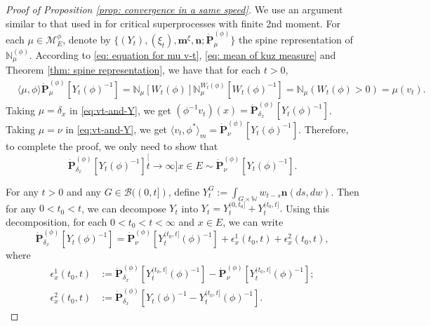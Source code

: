 \documentclass[12pt, a4paper]{amsart}
\theoremstyle{definition}
\numberwithin{equation}{section}
\begin{document}
\begin{proof}[Proof of Proposition \ref{prop: convergence in a same speed}]
	We use an argument similar to that used in \cite{RenSongSun2017Spine} for critical superprocesses with finite 2nd moment.
	For each $\mu\in\mathcal M^\phi_E$, denote by 
	$\{(Y_t), (\xi_t),\mathbf m^\xi, \mathbf n; \dot {\mathbf P}^{(\phi)}_\mu\}$
	the spine representation of $\mathbb N^{(\phi)}_\mu$. 
	According to \eqref	{eq: equation for mu v-t}, \eqref{eq: mean of kuz measure} and Theorem \ref{thm: spine representation}, 
	we have that for each $t>0$,
\[\begin{split}\label{eq:vt-and-Y}
	&\langle \mu,\phi \rangle \dot {\mathbf P}^{(\phi)}_\mu [Y_t(\phi)^{-1}]
	= \mathbb N_\mu[W_t(\phi)] \mathbb N^{W_t(\phi)}_\mu [W_t(\phi)^{-1}]
	= \mathbb N_\mu(W_t(\phi) > 0)
	= \mu(v_t).
\end{split}\]
	Taking $\mu = \delta_x$ in \eqref{eq:vt-and-Y}, we get $(\phi^{-1}v_t)(x) =\dot{\mathbf P}_{\delta_x}^{(\phi)}[Y_t(\phi)^{-1}]$.
	Taking $\mu = \nu$ in \eqref{eq:vt-and-Y}, we get $\langle v_t, \phi^*\rangle_m = \dot {\mathbf P}_{\nu}^{(\phi)} [Y_t(\phi)^{-1}]$.
	Therefore, to complete the proof, 
	we only need to show that
\[
	\dot{\mathbf P}_{\delta_x}^{(\phi)}[Y_t(\phi)^{-1}]
	\stackrel[t\to \infty]{x\in E}{\sim}  \dot {\mathbf P}_\nu^{(\phi)} [Y_t(\phi)^{-1}].
\]

	For any $t>0$ and any $G\in \mathscr B((0,t])$, define
$
	Y^G_t
	:= \int_{G\times \mathbb W} w_{t-s} \mathbf n(ds,dw).
$
	Then for any $0 < t_0 < t$, we can decompose $Y_t$ into
$
	Y_t
	= Y^{(0,t_0]}_t + Y^{(t_0,t]}_t.
$
	Using this decomposition, for each $0<t_0<t<\infty$ and $x\in E$, we can write
\[\label{eq: starting point of phi-1v_t(x)}
	 \dot{\mathbf P}_{\delta_x}^{(\phi)}[Y_t(\phi)^{-1}]
	= \dot {\mathbf P}_\nu^{(\phi)} [Y^{(t_0,t]}_t(\phi)^{-1}] + \epsilon_x^1(t_0,t) +\epsilon_x^2(t_0,t),
\]
	where
\[\begin{split}
	\epsilon_x^1(t_0,t)
	&:= \dot {\mathbf P}_{\delta_x}^{(\phi)} [Y^{(t_0,t]}_t(\phi)^{-1}] - \dot {\mathbf P}_\nu^{(\phi)} [Y^{(t_0,t]}_t(\phi)^{-1}];
	\\\epsilon_x^2(t_0,t)
	&:= \dot{\mathbf P}_{\delta_x}^{(\phi)}[Y_t(\phi)^{-1} - Y^{(t_0,t]}_t(\phi)^{-1}].
\end{split}\]


\end{proof}
\end{document}
